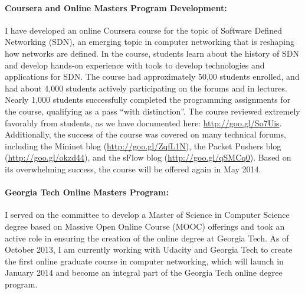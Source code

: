 \documentclass{article}
\begin{document}
\begin{cv}{}
\paragraph{Coursera and Online Masters Program Development:} I have
developed an online Coursera course for the topic of Software Defined
Networking (SDN), an emerging topic in computer networking that is
reshaping how networks are defined.  In the course, students learn about
the history of SDN and develop hands-on experience with tools to develop
technologies and applications for SDN.  The course had approximately
50,00 students enrolled, and had about 4,000 students actively
participating on the forums and in lectures.  Nearly 1,000 students
successfully completed the programming assignments for the course,
qualifying as a pass ``with distinction''.  The course reviewed
extremely favorably from students, as we have documented here:
\url{http://goo.gl/So7Uis}.  Additionally, the success of the course was
covered on many technical forums, including the Mininet blog
(\url{http://goo.gl/ZqfL1N}), the Packet Pushers blog
(\url{http://goo.gl/okzd44}), and the sFlow blog
(\url{http://goo.gl/qSMCq0}).  Based on its overwhelming success, the
course will be offered again in May 2014.


\paragraph{Georgia Tech Online Masters Program:} 
I served on the committee to develop a Master of Science in
Computer Science degree based on Massive Open Online Course (MOOC)
offerings and took an active role in ensuring the creation of the online
degree at Georgia Tech.  As of October 2013, I am currently working with
Udacity and Georgia Tech to create the first online graduate course in
computer networking, which will launch in January 2014 and become an
integral part of the Georgia Tech online degree program.


\end{cv}
\end{document}

